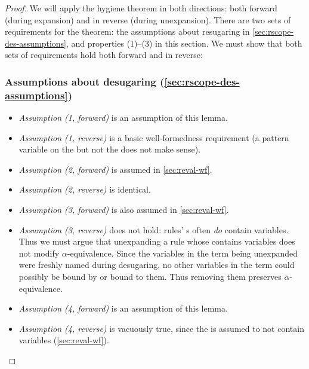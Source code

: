 \begin{proof}
  We will apply the hygiene theorem in both directions: both forward
  (during expansion) and in reverse (during unexpansion). There are
  two sets of requirements for the theorem: the assumptions about
  resugaring in \cref{sec:rscope-des-assumptions}, and properties
  (1)--(3) in this section. We must show that both sets of
  requirements hold both forward and in reverse:
  \subsubsection{Assumptions about desugaring (\cref{sec:rscope-des-assumptions})}
  \begin{itemize}[noitemsep]
  \item[] \emph{Assumption (1, forward)} is an assumption of this lemma.
  \item[] \emph{Assumption (1, reverse)} is a basic well-formedness
    requirement (a pattern variable on the  but not the
     does not make sense).
  \item[] \emph{Assumption (2, forward)} is assumed in \cref{sec:reval-wf}.
  \item[] \emph{Assumption (2, reverse)} is identical.
  \item[] \emph{Assumption (3, forward)} is also assumed in \cref{sec:reval-wf}.
  \item[] \emph{Assumption (3, reverse)} does not hold: rules'
    s often \emph{do} contain variables. Thus we must argue
    that unexpanding a rule whose  contains variables does not
    modify $\alpha$-equivalence. Since the variables in the term being
    unexpanded were freshly named during desugaring, no other
    variables in the term could possibly be bound by or bound to
    them. Thus removing them preserves $\alpha$-equivalence.
  \item[] \emph{Assumption (4, forward)} is an assumption of this lemma.
  \item[] \emph{Assumption (4, reverse)} is vacuously true, since the
     is assumed to not contain variables (\cref{sec:reval-wf}).
  \end{itemize}

\end{proof}
